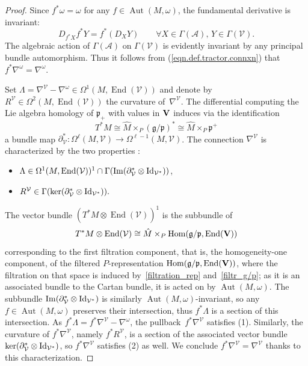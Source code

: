\documentclass[pdftex]{sigma}
\numberwithin{equation}{section}
\theoremstyle{definition}
\def\V{{\bf V}}
\newcommand{\cV}{{\mathcal V}}
\def\g{{\mathfrak g}}
\def\p{{\mathfrak p}}
\newcommand{\Aut}{\operatorname{Aut}}
\begin{document}
\begin{proof}
Since $f^*\omega=\omega$ for any $f \in \Aut(M,\omega)$, the fundamental derivative is invariant:
\[D_{f^* X} f^* Y = f^* (D_X Y) \qquad \forall X \in \Gamma({\mathcal{A}}), \, Y \in \Gamma(\mathcal{V}).\]
The algebraic action of $\Gamma(\mathcal{A})$ on $\Gamma(\mathcal{V})$ is evidently invariant by any principal bundle automorphism.
Thus it follows from (\ref{eqn.def.tractor.connxn}) that $f^*\nabla^\omega=\nabla^{\omega}$.

Set $\Lambda=\nabla^{\cV}-\nabla^{\omega}\in\Omega^1(M, \operatorname{End}(\cV))$ and denote by $R^{\cV}\in\Omega^2(M, \operatorname{End}(\cV))$ the curvature of~$\nabla^{\cV}$. The differential computing the Lie algebra homology of $\p_+$ with values in $\V$ induces via the identification
\[T^*M \cong \hat{M} \times_P (\g / \p)^* \cong \hat{M} \times_P \p^+\]
 a bundle map
$\partial^*_{\cV}\colon \Omega^\ell(M, \cV)\rightarrow \Omega^{\ell-1}(M, \cV)$. The connection $\nabla^{\cV}$ is characterized by the two properties \cite{hsss.prol.connxn}:
\begin{itemize}\itemsep=0pt
\item[(1)] $\Lambda\in\Omega^1(M, \operatorname{End}(\cV))^1\cap \Gamma(\operatorname{Im}(\partial^*_{\cV}\otimes {\rm Id}_{\cV^*}))$,
\item[(2)] $R^{{\cV}}\in\Gamma(\ker(\partial^*_{\cV}\otimes {\rm Id}_{\cV^*})).$
\end{itemize}
The vector bundle $(T^*M\otimes\operatorname{End}(\cV))^1$ is the subbundle of
\[
T^*M\otimes\operatorname{End}(\cV)\cong \hat M\times_P\operatorname{Hom}(\g/\p,\operatorname{End}({\bf V}))
\]
 corresponding to the first filtration component, that is, the homogeneity-one component, of the filtered $P$-representation
$\operatorname{Hom}(\g/\p,\operatorname{End}({\bf V}))$, where the filtration on that space is induced by~\eqref{filtration_rep} and~\eqref{filtr_g/p}; as it is an associated bundle to the Cartan bundle, it is acted on by $\Aut(M,\omega)$. The subbundle $\operatorname{Im}(\partial^*_{\cV}\otimes {\rm Id}_{\cV^*})$ is similarly $\Aut(M,\omega)$-invariant, so any $f \in \Aut(M,\omega)$ preserves their intersection, thus $f^*\Lambda$
is a section of this intersection. As $f^*\Lambda = f^*\nabla^\cV-\nabla^{\omega}$, the pullback~$f^* \nabla^\cV$ satisfies (1).
Similarly, the curvature of $f^*\nabla^\cV$, namely $f^*R^{{\cV}}$, is a section of the associated vector bundle $\ker(\partial^*_{\cV}\otimes {\rm Id}_{\cV^*})$, so $f^* \nabla^\cV$ satisfies (2) as well.
We conclude $f^*\nabla^{\cV}=\nabla^{\cV}$ thanks to this characterization.
\end{proof}
\end{document}
